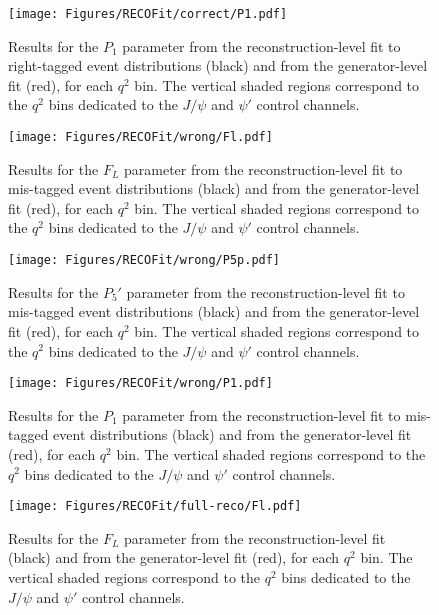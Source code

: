 \begin{figure}[!hbt]
  \centering
  \texttt{[image: Figures/RECOFit/correct/P1.pdf]}
  \caption{Results for the $P_1$ parameter from the reconstruction-level fit to right-tagged event distributions (black) and from the generator-level fit (red), for each $q^2$ bin.
    The vertical shaded regions correspond to the $q^2$ bins dedicated to the $J/\psi$ and $\psi'$ control channels.}
  \label{fig:correct-closure-p1}
\end{figure}

\begin{figure}[!hbt]
  \centering
  \texttt{[image: Figures/RECOFit/wrong/Fl.pdf]}
  \caption{Results for the $F_L$ parameter from the reconstruction-level fit to mis-tagged event distributions (black) and from the generator-level fit (red), for each $q^2$ bin.
    The vertical shaded regions correspond to the $q^2$ bins dedicated to the $J/\psi$ and $\psi'$ control channels.}
  \label{fig:wrong-closure-fl}
\end{figure}


\begin{figure}[!hbt]
  \centering
  \texttt{[image: Figures/RECOFit/wrong/P5p.pdf]}
  \caption{Results for the $P_5'$ parameter from the reconstruction-level fit to mis-tagged event distributions (black) and from the generator-level fit (red), for each $q^2$ bin.
    The vertical shaded regions correspond to the $q^2$ bins dedicated to the $J/\psi$ and $\psi'$ control channels.}
  \label{fig:wrong-closure-p5p}
\end{figure}

\begin{figure}[!hbt]
  \centering
  \texttt{[image: Figures/RECOFit/wrong/P1.pdf]}
  \caption{Results for the $P_1$ parameter from the reconstruction-level fit to mis-tagged event distributions (black) and from the generator-level fit (red), for each $q^2$ bin.
    The vertical shaded regions correspond to the $q^2$ bins dedicated to the $J/\psi$ and $\psi'$ control channels.}
  \label{fig:wrong-closure-p1}
\end{figure}

\begin{figure}[!hbt]
  \centering
  \texttt{[image: Figures/RECOFit/full-reco/Fl.pdf]}
  \caption{Results for the $F_L$ parameter from the reconstruction-level fit (black) and from the generator-level fit (red), for each $q^2$ bin.
    The vertical shaded regions correspond to the $q^2$ bins dedicated to the $J/\psi$ and $\psi'$ control channels.}
  \label{fig:fullreco-closure-fl}
\end{figure}


